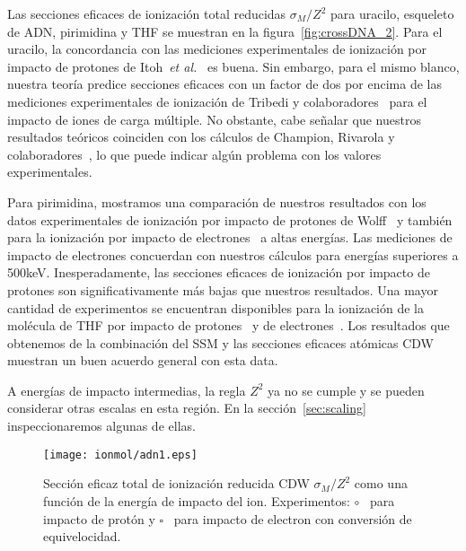 Las secciones eficaces de ionización total reducidas $\sigma_M/Z^2$ 
para uracilo, esqueleto de ADN, pirimidina y THF se muestran en la 
figura~\ref{fig:crossDNA_2}. Para el uracilo, la concordancia con las 
mediciones experimentales de ionización por impacto de protones de 
Itoh~\textit{et al.}~\cite{itoh2013} es buena. Sin embargo, para el 
mismo blanco, nuestra teoría predice secciones eficaces con un factor 
de dos por encima de las mediciones experimentales de ionización de 
Tribedi y colaboradores~\cite{agnihotri2012,agnihotri2013} para el 
impacto de iones de carga múltiple. No obstante, cabe señalar que 
nuestros resultados teóricos coinciden con los cálculos de Champion, 
Rivarola y colaboradores~\cite{agnihotri2012,champion2012}, lo que 
puede indicar algún problema con los valores experimentales.


Para pirimidina, mostramos una comparación de nuestros resultados con 
los datos experimentales de ionización por impacto de protones de 
Wolff~\cite{wolff2014} y también para la ionización por impacto de 
electrones~\cite{bug2017} a altas energías. Las mediciones de impacto 
de electrones concuerdan con nuestros cálculos para energías superiores 
a 500keV. Inesperadamente, las secciones eficaces de ionización por 
impacto de protones son significativamente más bajas que nuestros 
resultados. Una mayor cantidad de experimentos se encuentran disponibles 
para la ionización de la molécula de THF por impacto de 
protones~\cite{wang2016} y de electrones~\cite{bug2017,wolf2019,fuss2009}. 
Los resultados que obtenemos de la combinación del SSM y las secciones
eficaces atómicas CDW muestran un buen acuerdo general con esta data.

A energías de impacto intermedias, la regla $Z^2$ ya no se cumple y se 
pueden considerar otras escalas en esta región. En la 
sección~\ref{sec:scaling} inspeccionaremos algunas de ellas.



\begin{figure}
\centering
\texttt{[image: ionmol/adn1.eps]}
\caption[Sección eficaz total de ionización reducida de moléculas (parte 1).]
{Sección eficaz total de ionización reducida CDW $\sigma_{M}/Z^2$ como una 
función de la energía de impacto del ion. Experimentos: 
\mbox{\Large$\circ$}~\cite{iriki2011} para impacto de protón y
$\square$~\cite{rahman2016} para impacto de electron con conversión de
equivelocidad.}
\label{fig:crossDNA_1}
\end{figure} 

